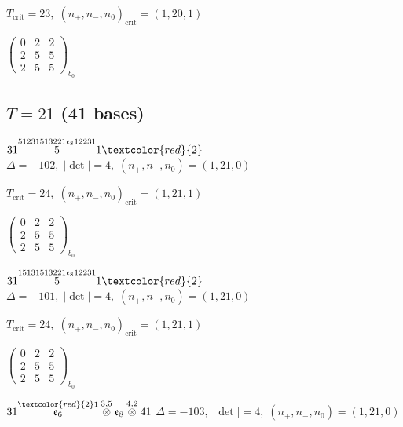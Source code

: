\documentclass[10pt]{article}
\begin{document}
\hspace{1em}$T_{\text{crit}}=23,\; (n_+,n_-,n_0)_{\text{crit}}=(1,20,1)$

\hspace{2em}$\left(\begin{smallmatrix}0 & 2 & 2 \\ 2 & 5 & 5 \\ 2 & 5 & 5\end{smallmatrix}\right)_{\!b_0}$


\subsection*{$T = 21$ \quad (41 bases)}
\smallskip

$31\overset{51231513221\mathfrak{e}_812231}{5}1\textcolor{red}{2}$ \quad $\Delta=-102,\; |\det|=4,\; (n_+,n_-,n_0)=(1,21,0)$

\hspace{1em}$T_{\text{crit}}=24,\; (n_+,n_-,n_0)_{\text{crit}}=(1,21,1)$

\hspace{2em}$\left(\begin{smallmatrix}0 & 2 & 2 \\ 2 & 5 & 5 \\ 2 & 5 & 5\end{smallmatrix}\right)_{\!b_0}$

\smallskip

$31\overset{15131513221\mathfrak{e}_812231}{5}1\textcolor{red}{2}$ \quad $\Delta=-101,\; |\det|=4,\; (n_+,n_-,n_0)=(1,21,0)$

\hspace{1em}$T_{\text{crit}}=24,\; (n_+,n_-,n_0)_{\text{crit}}=(1,21,1)$

\hspace{2em}$\left(\begin{smallmatrix}0 & 2 & 2 \\ 2 & 5 & 5 \\ 2 & 5 & 5\end{smallmatrix}\right)_{\!b_0}$

\smallskip

$31\overset{\textcolor{red}{2}1}{\mathfrak{e}_6}\overset{3,5}{\otimes}\mathfrak{e}_8\overset{4,2}{\otimes}41$ \quad $\Delta=-103,\; |\det|=4,\; (n_+,n_-,n_0)=(1,21,0)$
\end{document}
